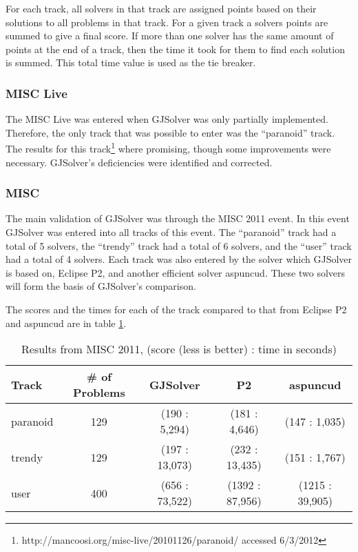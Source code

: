 For each track, all solvers in that track are assigned points based on their solutions to all problems in that track.
For a given track a solvers points are summed to give a final score.
If more than one solver has the same amount of points at the end of a track, then the time it took for them to find each solution is summed.
This total time value is used as the tie breaker.

\subsubsection{MISC Live}
The MISC Live was entered when GJSolver was only partially implemented.
Therefore, the only track that was possible to enter was the ``paranoid'' track.
The results for this track\footnote{http://mancoosi.org/misc-live/20101126/paranoid/ accessed 6/3/2012} where promising, though some improvements were necessary.
GJSolver's deficiencies were identified and corrected.

\subsubsection{MISC}
The main validation of GJSolver was through the MISC 2011 event.
In this event GJSolver was entered into all tracks of this event.
The ``paranoid'' track had a total of 5 solvers, the ``trendy'' track had a total of 6 solvers, 
and the ``user'' track had a total of 4 solvers.
Each track was also entered by the solver which GJSolver is based on, Eclipse P2, and another efficient solver aspuncud.
These two solvers will form the basis of GJSolver's comparison.

The scores and the times for each of the track compared to that from Eclipse P2 and aspuncud are in table \ref{impl.misc2011}.
\begin{table}[h!]
\begin{tabular}{| l | c | c | c | c |}\hline
Track & \# of Problems & GJSolver & P2 & aspuncud\\ \hline
paranoid & 129 & (190 : 5,294) & (181 : 4,646) & (147 : 1,035) \\ \hline
trendy & 129 & (197 : 13,073) & (232 : 13,435) & (151 : 1,767) \\ \hline
user & 400 & (656 : 73,522) & (1392 : 87,956) & (1215 : 39,905) \\ \hline
\end{tabular}
\caption{Results from MISC 2011, (score (less is better) : time in seconds)}
\label{impl.misc2011}
\end{table}

